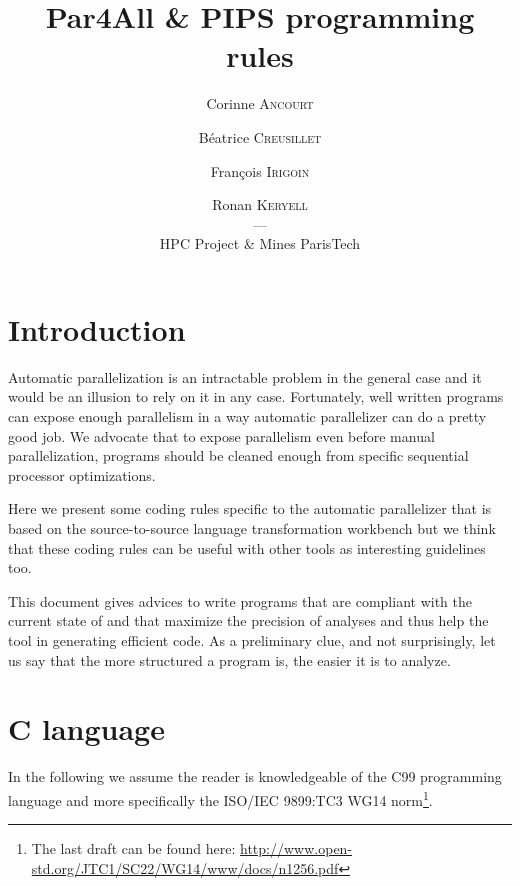 \documentclass[a4paper]{article}
\begin{document}
\title{Par4All \& PIPS programming rules}

\author{Corinne \textsc{Ancourt} \and Béatrice \textsc{Creusillet} \and
  François \textsc{Irigoin} \and Ronan \textsc{Keryell}\\
  ---\\
  HPC Project \& Mines ParisTech}

\maketitle

\tableofcontents{}



\section{Introduction}
\label{sec:introduction}

Automatic parallelization is an intractable problem in the general case
and it would be an illusion to rely on it in any case. Fortunately, well
written programs can expose enough parallelism in a way automatic
parallelizer can do a pretty good job. We advocate that to expose
parallelism even before manual parallelization, programs should be cleaned
enough from specific sequential processor optimizations.

Here we present some coding rules specific to the \Apfa automatic
parallelizer that is based on the \Apips source-to-source language
transformation workbench but we think that these coding rules can be
useful with other tools as interesting guidelines too.

This document gives advices to write programs that are compliant with the
current state of \Apips and that maximize the precision of analyses and
thus help the tool in generating efficient code. As a preliminary clue,
and not surprisingly, let us say that the more structured a program is,
the easier it is to analyze.


\section{C language}
\label{sec:c-language}

In the following we assume the reader is knowledgeable of the C99
programming language and more specifically the ISO/IEC 9899:TC3 WG14
norm\footnote{The last draft can be found here:
  \url{http://www.open-std.org/JTC1/SC22/WG14/www/docs/n1256.pdf}}.
\end{document}

